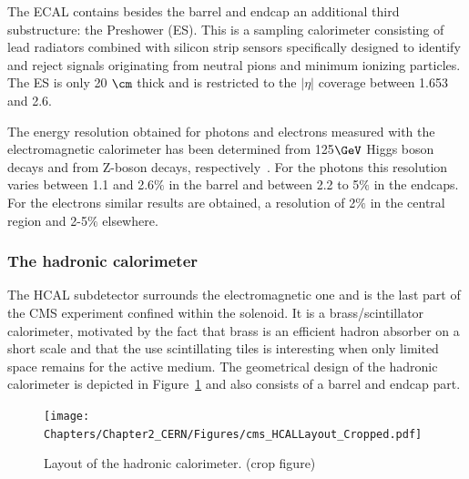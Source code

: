 The ECAL contains besides the barrel and endcap an additional third substructure: the Preshower (ES). This is a sampling calorimeter consisting of lead radiators combined with silicon strip sensors specifically designed to identify and reject signals originating from neutral pions and minimum ionizing particles.%
The ES is only 20 $\cm$ thick and is restricted to the $\vert \eta \vert$ coverage between 1.653 and 2.6. 

The energy resolution obtained for photons and electrons measured with the electromagnetic calorimeter has been determined from 125$\GeV$ Higgs boson decays and from Z-boson decays, respectively~\cite{ECALResolution}. For the photons this resolution varies between 1.1 and 2.6$\%$ in the barrel and between 2.2 to 5$\%$ in the endcaps. 
For the electrons similar results are obtained, a resolution of 2$\%$ in the central region and 2-5$\%$ elsewhere.

\subsubsection{The hadronic calorimeter}
The HCAL subdetector surrounds the electromagnetic one and is the last part of the CMS experiment confined within the solenoid.
It is a brass/scintillator calorimeter, motivated by the fact that brass is an efficient hadron absorber on a short scale and that the use scintillating tiles is interesting when only limited space remains for the active medium. The geometrical design of the hadronic calorimeter is depicted in Figure~\ref{fig::HCAL} and also consists of a barrel and endcap part.
\begin{figure}[h!t]
 \centering
 \texttt{[image: Chapters/Chapter2\_CERN/Figures/cms\_HCALLayout\_Cropped.pdf]}
 \caption{Layout of the hadronic calorimeter. (crop figure)} \label{fig::HCAL}
\end{figure}


